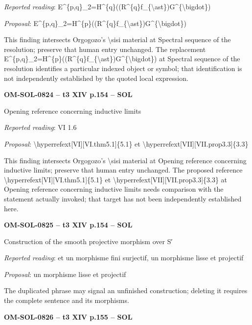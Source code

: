 \emph{Reported reading}: E\textasciicircum{}\{p,q\}\_2=\allowbreak H\textasciicircum{}\{q\}((R\textasciicircum{}\{q\}f\_\{\textbackslash{}ast\})G\textasciicircum{}\{\textbackslash{}bigdot\})\par
\emph{Proposal}: E\textasciicircum{}\{p,q\}\_2=\allowbreak H\textasciicircum{}\{p\}((R\textasciicircum{}\{q\}f\_\{\textbackslash{}ast\})G\textasciicircum{}\{\textbackslash{}bigdot\})\par
This finding intersects Orgogozo's \textbackslash{}sisi material at Spectral sequence of the resolution; preserve that human entry unchanged. The replacement E\textasciicircum{}\{p,q\}\_2=\allowbreak H\textasciicircum{}\{p\}((R\textasciicircum{}\{q\}f\_\{\textbackslash{}ast\})G\textasciicircum{}\{\textbackslash{}bigdot\}) at Spectral sequence of the resolution identifies a particular indexed object or symbol; that identification is not independently established by the quoted local expression.\par
\par\noindent\textbf{OM-SOL-0824 -- t3 XIV p.154 -- SOL}\par
Opening reference concerning inductive limits\par
\emph{Reported reading}: VI 1.6\par
\emph{Proposal}: \textbackslash{}hyperrefext[VI][VI.thm5.1]\{5.1\} et \textbackslash{}hyperrefext[VII][VII.prop3.3]\{3.3\}\par
This finding intersects Orgogozo's \textbackslash{}sisi material at Opening reference concerning inductive limits; preserve that human entry unchanged. The proposed reference \textbackslash{}hyperrefext[VI][VI.thm5.1]\{5.1\} et \textbackslash{}hyperrefext[VII][VII.prop3.3]\{3.3\} at Opening reference concerning inductive limits needs comparison with the statement actually invoked; that target has not been independently established here.\par
\par\noindent\textbf{OM-SOL-0825 -- t3 XIV p.154 -- SOL}\par
Construction of the smooth projective morphism over S′\par
\emph{Reported reading}: et un morphisme fini surjectif, un morphisme lisse et projectif\par
\emph{Proposal}: un morphisme lisse et projectif\par
The duplicated phrase may signal an unfinished construction; deleting it requires the complete sentence and its morphisms.\par
\par\noindent\textbf{OM-SOL-0826 -- t3 XIV p.155 -- SOL}\par
